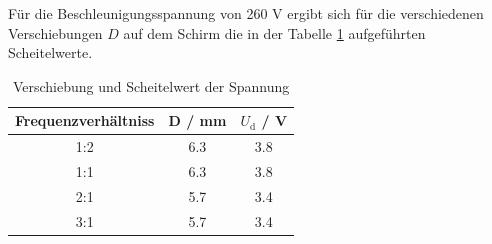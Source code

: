 Für die Beschleunigungsspannung von 260 V ergibt sich für die verschiedenen Verschiebungen $D$ auf dem Schirm die in der Tabelle \ref{tab:scheitel} aufgeführten Scheitelwerte.
\begin{table}[H]
  \centering
  \begin{tabular}{c c c}
    \toprule
	Frequenzverhältniss & D / mm & $U_\text{d}$ / V \\
    \midrule
	1:2	& 6.3 & 3.8 	\\
	1:1	& 6.3 & 3.8	\\
	2:1	& 5.7 & 3.4	\\
	3:1	& 5.7 & 3.4	\\
    \bottomrule
  \end{tabular}
  \caption{Verschiebung und Scheitelwert der Spannung}
  \label{tab:scheitel}
\end{table}
